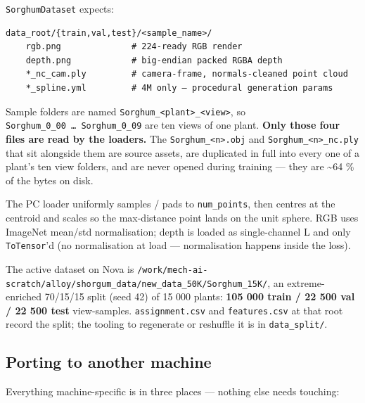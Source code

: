 \documentclass[
  10pt,
]{article}
\begin{document}
\texttt{SorghumDataset} expects:

\begin{verbatim}
data_root/{train,val,test}/<sample_name>/
    rgb.png              # 224-ready RGB render
    depth.png            # big-endian packed RGBA depth
    *_nc_cam.ply         # camera-frame, normals-cleaned point cloud
    *_spline.yml         # 4M only — procedural generation params
\end{verbatim}

Sample folders are named
\texttt{Sorghum\_\textless{}plant\textgreater{}\_\textless{}view\textgreater{}},
so \texttt{Sorghum\_0\_00\ …\ Sorghum\_0\_09} are ten views of one
plant. \textbf{Only those four files are read by the loaders.} The
\texttt{Sorghum\_\textless{}n\textgreater{}.obj} and
\texttt{Sorghum\_\textless{}n\textgreater{}\_nc.ply} that sit alongside
them are source assets, are duplicated in full into every one of a
plant's ten view folders, and are never opened during training --- they
are \textasciitilde64 \% of the bytes on disk.

The PC loader uniformly samples / pads to \texttt{num\_points}, then
centres at the centroid and scales so the max-distance point lands on
the unit sphere. RGB uses ImageNet mean/std normalisation; depth is
loaded as single-channel L and only \texttt{ToTensor}'d (no
normalisation at load --- normalisation happens inside the loss).

The active dataset on Nova is
\texttt{/work/mech-ai-scratch/alloy/shorgum\_data/new\_data\_50K/Sorghum\_15K/},
an extreme-enriched 70/15/15 split (seed 42) of 15 000 plants:
\textbf{105 000 train / 22 500 val / 22 500 test} view-samples.
\texttt{assignment.csv} and \texttt{features.csv} at that root record
the split; the tooling to regenerate or reshuffle it is in
\texttt{data\_split/}.

\subsection{Porting to another
machine}\label{porting-to-another-machine}

Everything machine-specific is in three places --- nothing else needs
touching:
\end{document}
